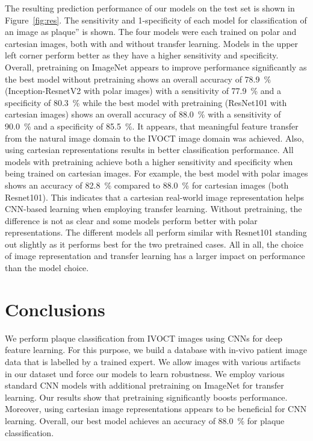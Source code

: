 The resulting prediction performance of our models on the test set is shown in Figure~\ref{fig:res}. The sensitivity and 1-specificity of each model for classification of an image as plaque” is shown. The four models were each trained on polar and cartesian images, both with and without transfer learning. Models in the upper left corner perform better as they have a higher sensitivity and specificity.
Overall, pretraining on ImageNet appears to improve performance significantly as the best model without pretraining shows an overall accuracy of \SI{78.9}{\percent} (Inception-ResnetV2 with polar images) with a sensitivity of \SI{77.9}{\percent} and a specificity of \SI{80.3}{\percent} while the best model with pretraining (ResNet101 with cartesian images) shows an overall accuracy of  \SI{88.0}{\percent} with a sensitivity of \SI{90.0}{\percent} and a specificity of \SI{85.5}{\percent}. It appears, that meaningful feature transfer from the natural image domain to the IVOCT image domain was achieved.
Also, using cartesian representations results in better classification performance. All models with pretraining achieve both a higher sensitivity and specificity when being trained on cartesian images. For example, the best model with polar images shows an accuracy of \SI{82.8}{\percent} compared to \SI{88.0}{\percent} for cartesian images (both Resnet101). This indicates that a cartesian real-world image representation helps CNN-based learning when employing transfer learning. Without pretraining, the difference is not as clear and some models perform better with polar representations.
The different models all perform similar with Resnet101 standing out slightly as it performs best for the two pretrained cases. All in all, the choice of image representation and transfer learning has a larger impact on performance than the model choice.

\section{Conclusions}

We perform plaque classification from IVOCT images using CNNs for deep feature learning. For this purpose, we build a database with in-vivo patient image data that is labelled by a trained expert. We allow images with various artifacts in our dataset und force our models to learn robustness. We employ various standard CNN models with additional pretraining on ImageNet for transfer learning. Our results show that pretraining significantly boosts performance. Moreover, using cartesian image representations appears to be beneficial for CNN learning. Overall, our best model achieves an accuracy of \SI{88.0}{\percent} for plaque classification.









